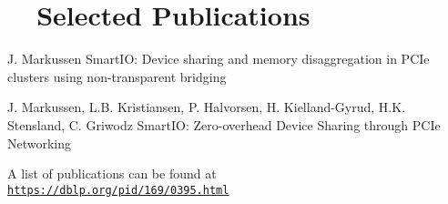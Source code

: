 \section[Selected Publications]{\faBook[regular]~~Selected Publications}
    {J. Markussen}
    {SmartIO: Device sharing and memory disaggregation in PCIe clusters using non-transparent bridging}

    {J. Markussen, L.B. Kristiansen, P. Halvorsen, H. Kielland-Gyrud, H.K. Stensland, C. Griwodz}
    {SmartIO: Zero-overhead Device Sharing through PCIe Networking}

%	
%
%

A list of publications can be found at\\
\texttt{\href{https://dblp.org/pid/169/0395.html}{https://dblp.org/pid/169/0395.html}}
